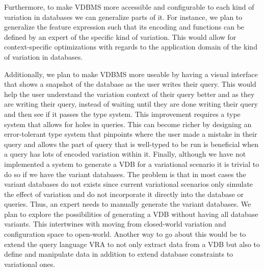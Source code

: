 %
Furthermore, to make VDBMS more accessible and configurable to each 
kind of variation in databases we can generalize parts of it. For instance, 
we plan to generalize the feature expression such that its encoding and functions
can be defined by an expert of the specific kind of variation. This would allow
for context-specific optimizations with regards to the application domain 
of the kind of variation in databases.

%
Additionally, we plan to make VDBMS more useable by having a visual 
interface that shows a snapshot of the database as the user writes their
query. This would help the user understand the variation context of their 
query better and as they are writing their query, instead of waiting until 
they are done writing their query and then see if it passes the type system.
%
This improvement requires a type system that allows for holes in queries.
This can become richer by 
designing an error-tolerant type system that pinpoints
where the user made a mistake in their query and allows the part of
query that is well-typed to be run is beneficial when a query has lots of 
encoded variation within it. 
%
Finally, although we have not implemented a system to generate a VDB for 
a variational scenario it is trivial to do so if we have the variant databases.
The problem is that in most cases the variant databases do not exists
since current variational scenarios only simulate the effect of variation
and do not incorporate it directly into the database or queries.
Thus, an expert needs to manually generate the variant databases.
%
We plan to explore the possibilities of generating a VDB without 
having all database variants. This intertwines with moving from closed-world
variation and configuration space to open-world. 
%
Another way to go about this would be to extend the query language VRA 
to not only extract data from a VDB but also to define and manipulate data
in addition to extend database constraints to variational ones. 



